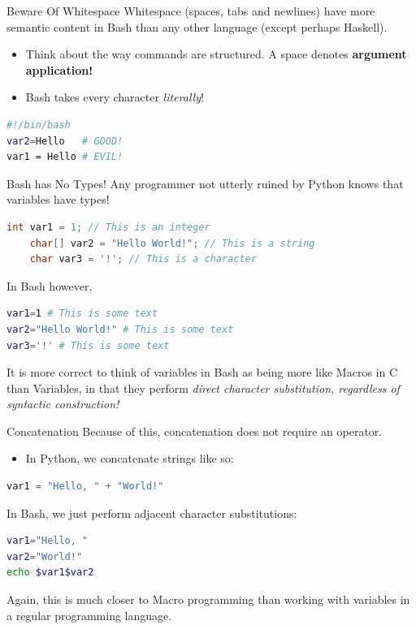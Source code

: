 \documentclass[11pt]{beamer}
\begin{document}
\begin{frame}[fragile=singleslide]{Beware Of Whitespace}
Whitespace (spaces, tabs and newlines) have more semantic content in Bash than any other language (except perhaps Haskell).
\begin{itemize}
\item Think about the way commands are structured.  A space denotes \textbf{argument application!}
\item Bash takes every character \emph{literally}! 
\end{itemize}
\begin{lstlisting}[style=terminal, language=bash]
#!/bin/bash
var2=Hello   # GOOD! 
var1 = Hello # EVIL!
\end{lstlisting}
\end{frame}

\begin{frame}[fragile=singleslide]{Bash has No Types!}
Any programmer not utterly ruined by Python knows that variables have types! 
\begin{lstlisting}[style=C, language=C]
	int var1 = 1; // This is an integer
	char[] var2 = "Hello World!"; // This is a string
	char var3 = '!'; // This is a character
\end{lstlisting}
In Bash however,
\begin{lstlisting}[style=terminal, language=bash]
var1=1 # This is some text
var2="Hello World!" # This is some text
var3='!' # This is some text
\end{lstlisting}
It is more correct to think of variables in Bash as being more like Macros in C than Variables, in that they perform \emph{direct character substitution, regardless of syntactic construction!}
\end{frame}

\begin{frame}[fragile=singleslide]{Concatenation}
Because of this, concatenation does not require an operator.  
\begin{itemize}
\item In Python, we concatenate strings like so:
\end{itemize}
\begin{lstlisting}[style=C, language=python]
var1 = "Hello, " + "World!"
\end{lstlisting}
In Bash, we just perform adjacent character substitutions:
\begin{lstlisting}[style=terminal, language=bash]
var1="Hello, "
var2="World!"
echo $var1$var2
\end{lstlisting}
Again, this is much closer to Macro programming than working with variables in a regular programming language.  
\end{frame}
\end{document}
